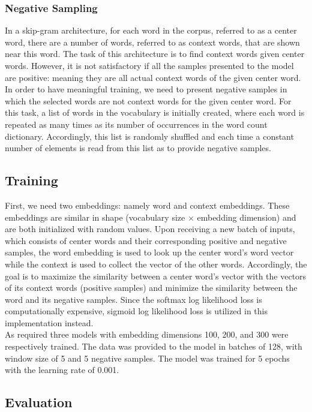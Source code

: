 \documentclass[12pt,a4paper]{article}
\begin{document}
	\subsubsection{Negative Sampling}
	In a skip-gram architecture, for each word in the corpus, referred to as a center word, there are a number of words, referred to as context words, that are shown near this word. The task of this architecture is to find context words given center words. However, it is not satisfactory if all the samples presented to the model are positive: meaning they are all actual context words of the given center word. In order to have meaningful training, we need to present negative samples in which the selected words are not context words for the given center word. For this task, a list of words in the vocabulary is initially created, where each word is repeated as many times as its number of occurrences in the word count dictionary. Accordingly, this list is randomly shuffled and each time a constant number of elements is read from this list as to provide negative samples.
	
	\subsection{Training}
	First, we need two embeddings: namely word and context embeddings. These embeddings are similar in shape (vocabulary size $\times$ embedding dimension) and are both initialized with random values. Upon receiving a new batch of inputs, which consists of center words and their corresponding positive and negative samples, the word embedding is used to look up the center word's word vector while the context is used to collect the vector of the other words. Accordingly, the goal is to maximize the similarity between a center word's vector with the vectors of its context words (positive samples) and minimize the similarity between the word and its negative samples. Since the softmax log likelihood loss is computationally expensive, sigmoid log likelihood loss is utilized in this implementation instead.
	\\
	As required three models with embedding dimensions 100, 200, and 300 were respectively trained. The data was provided to the model in batches of 128, with window size of 5 and 5 negative samples. The model was trained for 5 epochs with the learning rate of 0.001.
	
	\subsection{Evaluation}
\end{document}
